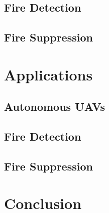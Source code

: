 \documentclass[runningheads]{llncs}
\begin{document}
\subsection{Fire Detection}

\subsection{Fire Suppression}

\section{Applications}

\subsection{Autonomous UAVs}

\subsection{Fire Detection}

\subsection{Fire Suppression}

\section{Conclusion}


\end{document}
